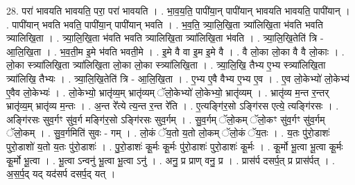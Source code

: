 \documentclass[17pt]{extarticle}
\begin{document}
28. परा॑ भावयति भावयति॒ परा॒ परा॑ भावयति । . भा॒व॒य॒ति॒ पापी॑या॒न् पापी॑यान् भावयति भावयति॒ पापी॑यान् । . पापी॑यान् भवति भवति॒ पापी॑या॒न् पापी॑यान् भवति । . भ॒व॒ति॒ त्र्या॒लि॒खि॒ता त्र्या॑लिखि॒ता भ॑वति भवति त्र्यालिखि॒ता । . त्र्या॒लि॒खि॒ता भ॑वति भवति त्र्यालिखि॒ता त्र्या॑लिखि॒ता भ॑वति । . त्र्या॒लि॒खि॒तेति॑ त्रि - आ॒लि॒खि॒ता । . भ॒व॒ती॒म इ॒मे भ॑वति भवती॒मे । . इ॒मे वै वा इ॒म इ॒मे वै । . वै लो॒का लो॒का वै वै लो॒काः । . लो॒का स्त्र्या॑लिखि॒ता त्र्या॑लिखि॒ता लो॒का लो॒का स्त्र्या॑लिखि॒ता । . त्र्या॒लि॒खि॒ तैभ्य ए॒भ्य स्त्र्या॑लिखि॒ता त्र्या॑लिखि॒ तैभ्यः । . त्र्या॒लि॒खि॒तेति॑ त्रि - आ॒लि॒खि॒ता । . ए॒भ्य ए॒वै वैभ्य ए॒भ्य ए॒व । . ए॒व लो॒केभ्यो॑ लो॒केभ्य॑ ए॒वैव लो॒केभ्यः॑ । . लो॒केभ्यो॒ भ्रातृ॑व्य॒म् भ्रातृ॑व्यम् ॅलो॒केभ्यो॑ लो॒केभ्यो॒ भ्रातृ॑व्यम् । . भ्रातृ॑व्य म॒न्त र॒न्तर् भ्रातृ॑व्य॒म् भ्रातृ॑व्य म॒न्तः । . अ॒न्त रे᳚त्ये त्य॒न्त र॒न्त रे॑ति । . ए॒त्यङ्गि॑र॒सो ऽङ्गि॑रस एत्ये॒ त्यङ्गि॑रसः । . अङ्गि॑रसः सुव॒र्गꣳ सु॑व॒र्ग मङ्गि॑र॒सो ऽङ्गि॑रसः सुव॒र्गम् । . सु॒व॒र्गम् ॅलो॒कम् ॅलो॒कꣳ सु॑व॒र्गꣳ सु॑व॒र्गम् ॅलो॒कम् । . सु॒व॒र्गमिति॑ सुवः - गम् । . लो॒कं ॅय॒तो य॒तो लो॒कम् ॅलो॒कं ॅय॒तः । . य॒तः पु॑रो॒डाशः॑ पुरो॒डाशो॑ य॒तो य॒तः पु॑रो॒डाशः॑ । . पु॒रो॒डाशः॑ कू॒र्मः कू॒र्मः पु॑रो॒डाशः॑ पुरो॒डाशः॑ कू॒र्मः । . कू॒र्मो भू॒त्वा भू॒त्वा कू॒र्मः कू॒र्मो भू॒त्वा । . भू॒त्वा ऽन्वनु॑ भू॒त्वा भू॒त्वा ऽनु॑ । . अनु॒ प्र प्राण् वनु॒ प्र । . प्रास॑र्प दसर्प॒त् प्र प्रास॑र्पत् । . अ॒स॒र्प॒द् यद् यद॑सर्प दसर्प॒द् यत् । \newline
\end{document}
